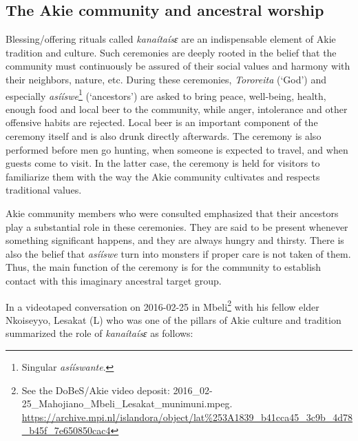 \documentclass[output=paper,colorlinks,citecolor=brown]{langscibook}
\begin{document}
\subsection{The Akie community and ancestral worship}\label{sec:legere:3.2}

Blessing/offering rituals called \textit{kanaítaísɛ} are an indispensable element of Akie tradition and culture. Such ceremonies are deeply rooted in the belief that the community must continuously be assured of their social values and harmony with their neighbors, nature, etc. During these ceremonies, \textit{Tororeita} (‘God’) and especially \textit{asííswe}\footnote{Singular \textit{asííswante}.} (‘ancestors’) are asked to bring peace, well-being, health, enough food and local beer to the community, while anger, intolerance and other offensive habits are rejected. Local beer is an important component of the ceremony itself and is also drunk directly afterwards. The ceremony is also performed before men go hunting, when someone is expected to travel, and when guests come to visit. In the latter case, the ceremony is held for visitors to familiarize them with the way the Akie community cultivates and respects traditional values.

Akie community members who were consulted emphasized that their ancestors play a substantial role in these ceremonies. They are said to be present whenever something significant happens, and they are always hungry and thirsty. There is also the belief that \textit{asííswe} turn into monsters if proper care is not taken of them. Thus, the main function of the ceremony is for the community to establish contact with this imaginary ancestral target group. 

In a videotaped conversation on 2016-02-25 in Mbeli\footnote{See the DoBeS/Akie video deposit: 2016\_02-25\_Mahojiano\_Mbeli\_Lesakat\_munimuni.mpeg.
\url{https://archive.mpi.nl/islandora/object/lat\%253A1839_b41cca45_3c9b_4d78_b45f_7e650850cac4}} with his fellow elder Nkoiseyyo,  Lesakat (L) who was one of the pillars of Akie culture and tradition summarized the role of \textit{kanaítaísɛ} as follows:
\end{document}
